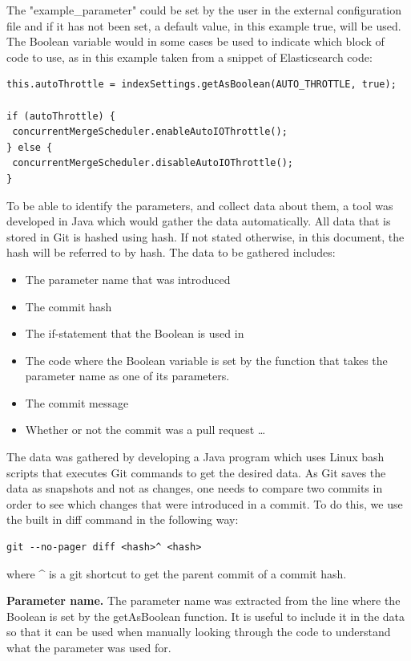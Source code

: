 The "example\_parameter" could be set by the user in the external configuration file and if it has not been set, a default value, in this example true, will be used. The Boolean variable would in some cases be used to indicate which block of code to use, as in this example taken from a snippet of Elasticsearch code:\\
\lstset{language=Java}
\begin{lstlisting}[frame=single]
this.autoThrottle = indexSettings.getAsBoolean(AUTO_THROTTLE, true);

if (autoThrottle) {
 concurrentMergeScheduler.enableAutoIOThrottle();
} else {
 concurrentMergeScheduler.disableAutoIOThrottle();
}
\end{lstlisting}

To be able to identify the parameters, and collect data about them, a tool was developed in Java which would gather the data automatically. All data that is stored in Git is hashed using hash. If not stated otherwise, in this document, the hash will be referred to by hash. The data to be gathered includes:
\begin{itemize}
\item The parameter name that was introduced
\item The commit hash
\item The if-statement that the Boolean is used in
\item The code where the Boolean variable is set by the function that takes the parameter name as one of its parameters.
\item The commit message
\item Whether or not the commit was a pull request \ldots
\end{itemize}
The data was gathered by developing a Java program which uses Linux bash scripts that executes Git commands to get the desired data. As Git saves the data as snapshots and not as changes, one needs to compare two commits in order to see which changes that were introduced in a commit. To do this, we use the built in diff command in the following way: %
\lstset{language=Bash}
\begin{lstlisting}[frame=single]
git --no-pager diff <hash>^ <hash>
\end{lstlisting}
where \^{} is a git shortcut to get the parent commit of a commit hash.

\textbf{Parameter name.} The parameter name was extracted from the line where the Boolean is set by the getAsBoolean function. It is useful to include it in the data so that it can be used when manually looking through the code to understand what the parameter was used for.

